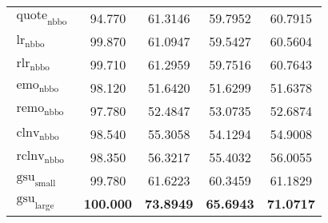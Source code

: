\begin{table}[ht]
\begin{tabular}{lSSSS}
        $\operatorname{quote}_{\mathrm{nbbo}}$ & 94.770            & 61.3146                            & 59.7952           & 60.7915           \\
        $\operatorname{lr}_{\mathrm{nbbo}}$    & 99.870            & 61.0947                            & 59.5427           & 60.5604           \\
        $\operatorname{rlr}_{\mathrm{nbbo}}$   & 99.710            & 61.2959                            & 59.7516           & 60.7643           \\
        $\operatorname{emo}_{\mathrm{nbbo}}$   & 98.120            & 51.6420                            & 51.6299           & 51.6378           \\
        $\operatorname{remo}_{\mathrm{nbbo}}$  & 97.780            & 52.4847                            & 53.0735           & 52.6874           \\
        $\operatorname{clnv}_{\mathrm{nbbo}}$  & 98.540            & 55.3058                            & 54.1294           & 54.9008           \\
        $\operatorname{rclnv}_{\mathrm{nbbo}}$ & 98.350            & 56.3217                            & 55.4032           & 56.0055           \\\midrule
        $\operatorname{gsu}_{\mathrm{small}}$  & 99.780            & 61.6223                            & 60.3459           & 61.1829           \\
        $\operatorname{gsu}_{\mathrm{large}}$  & \bfseries 100.000 & \bfseries 73.8949                  & \bfseries 65.6943 & \bfseries 71.0717 \\\bottomrule
    \end{tabular}
\end{table}

